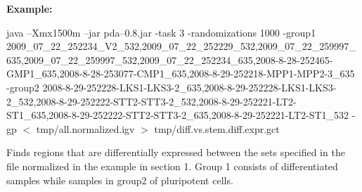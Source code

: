\documentclass[11pt]{article}
\begin{document}
{\bf Example:}

java --Xmx1500m  --jar pda--0.8.jar -task 3 -randomizations 1000  -group1 2009\_07\_22\_252234\_V2\_532,2009\_07\_22\_252229\_532,2009\_07\_22\_259997\_635,2009\_07\_22\_259997\_532,2009\_07\_22\_252234\_635,2008-8-28-252465-GMP1\_635,2008-8-28-253077-CMP1\_635,2008-8-29-252218-MPP1-MPP2-3\_635 -group2 2008-8-29-252228-LKS1-LKS3-2\_635,2008-8-29-252228-LKS1-LKS3-2\_532,2008-8-29-252222-STT2-STT3-2\_532,2008-8-29-252221-LT2-ST1\_635,2008-8-29-252222-STT2-STT3-2\_635,2008-8-29-252221-LT2-ST1\_532 -gp $<$ tmp/all.normalized.igv  $>$ tmp/diff.vs.stem.diff.expr.gct

Finds regions that are differentially expressed between the sets specified in the file normalized in the example in section 1.  Group 1 consists of differentiated samples while samples in group2 of pluripotent cells.
\end{document}
